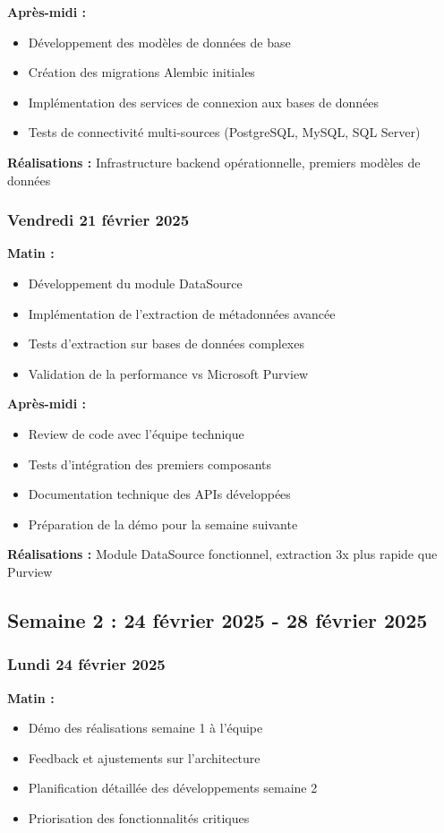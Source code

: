\documentclass[a4paper,12pt]{article}
\begin{document}
\textbf{Après-midi :}
\begin{itemize}
    \item Développement des modèles de données de base
    \item Création des migrations Alembic initiales
    \item Implémentation des services de connexion aux bases de données
    \item Tests de connectivité multi-sources (PostgreSQL, MySQL, SQL Server)
\end{itemize}

\textbf{Réalisations :} Infrastructure backend opérationnelle, premiers modèles de données

\subsubsection*{Vendredi 21 février 2025}
\textbf{Matin :}
\begin{itemize}
    \item Développement du module DataSource
    \item Implémentation de l'extraction de métadonnées avancée
    \item Tests d'extraction sur bases de données complexes
    \item Validation de la performance vs Microsoft Purview
\end{itemize}

\textbf{Après-midi :}
\begin{itemize}
    \item Review de code avec l'équipe technique
    \item Tests d'intégration des premiers composants
    \item Documentation technique des APIs développées
    \item Préparation de la démo pour la semaine suivante
\end{itemize}

\textbf{Réalisations :} Module DataSource fonctionnel, extraction 3x plus rapide que Purview

\subsection*{Semaine 2 : 24 février 2025 - 28 février 2025}

\subsubsection*{Lundi 24 février 2025}
\textbf{Matin :}
\begin{itemize}
    \item Démo des réalisations semaine 1 à l'équipe
    \item Feedback et ajustements sur l'architecture
    \item Planification détaillée des développements semaine 2
    \item Priorisation des fonctionnalités critiques
\end{itemize}
\end{document}
